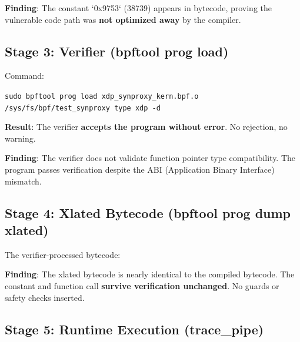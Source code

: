 \noindent
\textbf{Finding}: The constant `0x9753` (38739) appears in bytecode, proving the vulnerable code path was \textbf{not optimized away} by the compiler.

\subsection{Stage 3: Verifier (bpftool prog load)}

Command:
\begin{tcolorbox}[colback=gray!10, colframe=gray!10, arc=2pt, boxrule=0pt]
\small\ttfamily
\texttt{sudo bpftool prog load xdp\_synproxy\_kern.bpf.o /sys/fs/bpf/test\_synproxy type xdp -d}
\end{tcolorbox}

\noindent
\textbf{Result}: The verifier \textbf{accepts the program without error}. No rejection, no warning.

\noindent
\textbf{Finding}: The verifier does not validate function pointer type compatibility. The program passes verification despite the ABI (Application Binary Interface) mismatch.

\subsection{Stage 4: Xlated Bytecode (bpftool prog dump xlated)}

The verifier-processed bytecode:

\vspace{0.3cm}
\noindent
{}
\vspace{0.3cm}

\noindent
\textbf{Finding}: The xlated bytecode is nearly identical to the compiled bytecode. The constant and function call \textbf{survive verification unchanged}. No guards or safety checks inserted.

\subsection{Stage 5: Runtime Execution (trace\_pipe)}

